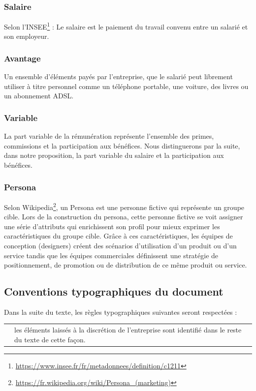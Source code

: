 \documentclass[12pt]{article}
\newcommand{\assemblee}[1]{%
  \begin{tcolorbox}[colframe=DarkPlum,boxrule=2pt,arc=4pt,left=6pt,right=6pt,top=6pt,bottom=6pt,boxsep=0pt,colback=white]
    \begin{tabular}{m{1cm} m{0.86\textwidth}}
      {\huge \faUsers} & #1 \\
    \end{tabular}
  \end{tcolorbox}
}
\begin{document}
\subsubsection{Salaire}
 Selon l’INSEE\footnote{\url{https://www.insee.fr/fr/metadonnees/definition/c1211}} : Le salaire est le paiement du travail convenu entre un salarié et son employeur. 

\subsubsection{Avantage}
 Un ensemble d’éléments payés par l’entreprise, que le salarié peut librement utiliser à titre personnel comme un téléphone portable, une voiture, des livres ou un abonnement ADSL.

\subsubsection{Variable}
 La part variable de la rémunération représente l’ensemble des primes, commissions et la participation aux bénéfices.
 Nous distinguerons par la suite, dans notre proposition, la part variable du salaire et la participation aux bénéfices.

\subsubsection{Persona}
 Selon Wikipedia\footnote{\url{https://fr.wikipedia.org/wiki/Persona\_(marketing)}}, un Persona est une personne fictive qui représente un groupe cible. Lors de la construction du persona, cette personne fictive se voit assigner une série d'attributs qui enrichissent son profil pour mieux exprimer les caractéristiques du groupe cible. Grâce à ces caractéristiques, les équipes de conception (designers) créent des scénarios d'utilisation d'un produit ou d'un service tandis que les équipes commerciales définissent une stratégie de positionnement, de promotion ou de distribution de ce même produit ou service.

\subsection{Conventions typographiques du document}
  Dans la suite du texte, les règles typographiques suivantes seront respectées :

  \assemblee{les éléments laissés à la discrétion de l'entreprise sont identifié dans le reste du texte de cette façon.}
\end{document}
